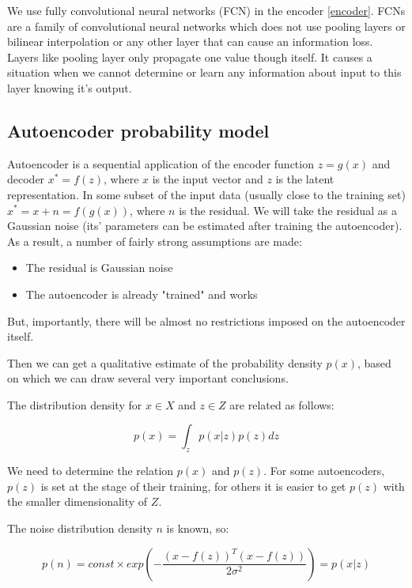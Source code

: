 We use fully convolutional neural networks (FCN) in the encoder \ref{encoder}. FCNs are a family of convolutional neural networks which does not use pooling layers or bilinear interpolation or any other layer that can cause an information loss. Layers like pooling layer only propagate one value though itself. It causes a situation when we cannot determine or learn any information about input to this layer knowing it's output.

\subsection{Autoencoder probability model}

Autoencoder is a sequential application of the encoder function $z=g(x)$ and decoder $x^*=f(z)$, where $x$ is the input vector and $z$ is the latent representation. In some subset of the input data (usually close to the training set) $x^*=x+n=f(g(x))$, where $n$ is the residual. We will take the residual as a Gaussian noise (its' parameters can be estimated after training the autoencoder). As a result, a number of fairly strong assumptions are made:

\begin{itemize}
    \item The residual is Gaussian noise
    \item The autoencoder is already "trained" and works
\end{itemize}

But, importantly, there will be almost no restrictions imposed on the autoencoder itself.

Then we can get a qualitative estimate of the probability density $p(x)$, based on which we can draw several very important conclusions.

The distribution density for $x\in X$ and $z\in Z$ are related as follows:

\begin{equation}
    \label{eq:autoencoder-density}
    p(x) = \int_{z} p(x|z)p(z)dz
\end{equation}

We need to determine the relation $p(x)$ and $p(z)$. For some autoencoders, $p(z)$ is set at the stage of their training, for others it is easier to get $p(z)$ with the smaller dimensionality of $Z$.

The noise distribution density $n$ is known, so:

\begin{equation}
    \label{eq:autoencoder-noise-density}
    p(n)=const\times exp( -\frac{(x-f(z))^T (x-f(z))}{2\sigma^2} )=p(x|z)
\end{equation}

